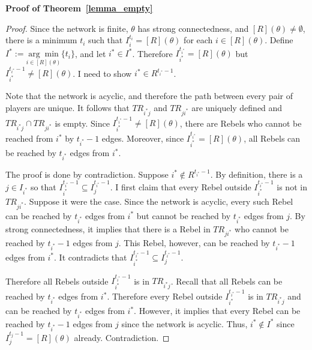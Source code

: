 \documentclass[12pt,letter]{article}
\newtheorem*{lemma*}{Lemma}
\newtheorem{definition}{Definition}[section]
\theoremstyle{definition}
\theoremstyle{definition}
\theoremstyle{remark}
\theoremstyle{claim}
\begin{document}
%
\bigskip
\noindent\textbf{Proof of Theorem~\ref{lemma_empty}}
\begin{proof}



Since the network is finite, $\theta$ has strong connectedness, and $[R](\theta)\neq \emptyset$, there is a minimum $t_i$ such that $I^{t_i}_i=[R](\theta)$ for each $i\in [R](\theta)$. 
Define $I^{*}:=\underset{i\in [R](\theta)}{\arg\min}\{t_i\}$, and let $i^{*}\in I^{*}$. Therefore $I^{t_{i^{*}}}_{i^{*}}=[R](\theta)$ but $I^{t_{i^{*}}-1}_{i^{*}}\neq [R](\theta)$. I need to show $i^{*}\in R^{t_{i^{*}}-1}$. 

Note that the network is acyclic, and therefore the path between every pair of players are unique. It follows that $TR_{i^{*}j}$ and $TR_{ji^{*}}$ are uniquely defined and $TR_{i^{*}j}\cap TR_{ji^{*}}$ is empty. Since $I^{t_{i^{*}}-1}_{i^{*}}\neq [R](\theta)$, there are Rebels who cannot be reached from $i^{*}$ by $t_{i^{*}}-1$ edges. Moreover, since $I^{t_{i^{*}}}_{i^{*}}= [R](\theta)$, all Rebels can be reached by $t_{i^{*}}$ edges from $i^{*}$.

The proof is done by contradiction. Suppose $i^{*}\not\in R^{t_{i^{*}}-1}$. By definition, there is a $j\in I_{i^{*}}$ so that $I^{t_{i^{*}}-1}_{i^{*}}\subseteq I^{t_{i^{*}}-1}_j$. I first claim that every Rebel outside $I^{t_{i^{*}}-1}_{i^{*}}$ is not in $TR_{ji^{*}}$. Suppose it were the case. Since the network is acyclic, every such Rebel can be reached by $t_{i^{*}}$ edges from $i^{*}$ but cannot be reached by $t_{i^{*}}$ edges from $j$. By strong connectedness, it implies that there is a Rebel in $TR_{ji^{*}}$ who cannot be reached by $t_{i^{*}}-1$ edges from $j$. This Rebel, however, can be reached by $t_{i^{*}}-1$ edges from $i^{*}$. It contradicts that $I^{t_{i^{*}}-1}_{i^{*}}\subseteq I^{t_{i^{*}}-1}_j$.

Therefore all Rebels outside $I^{t_{i^{*}}-1}_{i^{*}}$ is in $TR_{i^{*}j}$. Recall that all Rebels can be reached by $t_{i^{*}}$ edges from $i^{*}$. Therefore every Rebel outside $I^{t_{i^{*}}-1}_{i^{*}}$ is in $TR_{i^{*}j}$ and can be reached by $t_{i^{*}}$ edges from $i^{*}$. However, it implies that every Rebel can be reached by $t_{i^{*}}-1$ edges from $j$ since the network is acyclic. Thus, $i^{*}\notin I^{*}$ since $I^{t_j-1}_j=[R](\theta)$ already. Contradiction.

\end{proof}
\end{document}
